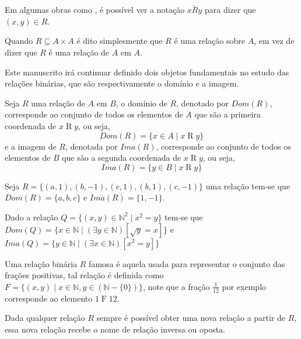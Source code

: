 \begin{rema}
	Em algumas obras como \cite{carmo2013}, é possível ver a notação $x \underrightarrow{R} y$ para dizer que $(x, y) \in R$.
\end{rema}

\begin{rema}
	Quando $R \subseteq A \times A$ é dito simplesmente que $R$ é uma relação sobre $A$, em vez de dizer que $R$ é uma relação de $A$ em $A$.
\end{rema}

Este manuscrito irá continuar definido dois objetos fundamentais no estudo das relações binárias, que são respectivamente o domínio e a imagem.

\begin{definition}\label{def:DominioImagemRelacoes}
	Seja $R$ uma relação de $A$ em $B$, o domínio de $R$, denotado por $Dom(R)$, corresponde ao conjunto de todos os elementos de $A$ que são a primeira coordenada de $x\mathrel{R}y$, ou seja, 
	$$Dom(R) = \{x \in A \mid x\mathrel{R}y\}$$
 	e a imagem de $R$, denotada por $Ima(R)$, corresponde ao conjunto de todos os elementos de $B$ que são a segunda coordenada de $x\mathrel{R}y$, ou seja, 
	$$Ima(R) = \{y \in B \mid x\mathrel{R}y\}$$
\end{definition}

\begin{exem}\label{exe:RelacaoBinaria1}
	Seja $R = \{(a, 1), (b, -1), (c, 1), (b, 1), (c, -1)\}$ uma relação tem-se que $Dom(R) = \{a, b, c\}$ e $Ima(R) = \{1, -1\}$.
\end{exem}

\begin{exem}
	Dado a relação $Q = \{(x, y) \in \mathbb{N}^2 \mid x^2 = y\}$ tem-se que $Dom(Q) = \{x \in \mathbb{N} \mid (\exists y \in \mathbb{N})[\sqrt{y} = x]\}$ e $Ima(Q) = \{y \in \mathbb{N} \mid (\exists x \in \mathbb{N})[x^2 = y]\}$
\end{exem}

\begin{exem}
	Uma relação binária $R$ famosa é aquela usada para representar o conjunto das frações positivas, tal relação é definida como $F = \{(x, y)\mid x \in \mathbb{N}, y \in (\mathbb{N}-\{0\})\}$, note que a fração $\displaystyle\frac{1}{12}$ por exemplo corresponde ao elemento $1\mathrel{F}12$.
\end{exem}

Dada qualquer relação $R$ sempre é possível obter uma nova relação a partir de $R$, essa nova relação recebe o nome de relação inversa ou oposta.

